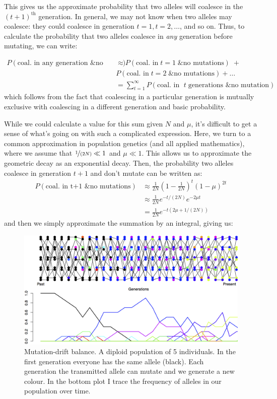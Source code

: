 This gives us the approximate probability that two alleles will coalesce in the
$(t+1)^\text{th}$ generation. In general, we may not know when two alleles may
coalesce: they could coalesce in generation $t=1, t=2, \ldots $, and so on.
Thus, to calculate the probability that two alleles coalesce in \emph{any}
generation before mutating, we can write:

\begin{align*}
  P(\textrm{coal. in any generation \& no mutations}) &\approx P(\textrm{coal. in} \; t=1 \; \textrm{\& no mutations}) \; + \\ 
&  P(\textrm{coal. in} \; t=2 \; \textrm{\& no mutations}) + \ldots \\
  &= \sum_{t=1}^\infty P(\textrm{coal. in } \; t \; \textrm{generations \& no mutation})
\end{align*}
%
which follows from the fact that coalescing in a particular generation is
mutually exclusive with coalescing in a different generation and basic probability.

While we could calculate a value for this sum given $N$ and $\mu$, it's
difficult to get a sense of what's going on with such a complicated expression.
Here, we turn to a common approximation in population genetics (and all applied
mathematics), where we assume that $\nicefrac{1}{(2N)} \ll 1$ and $\mu \ll 1$.
This allows us to approximate the geometric decay as an exponential decay.
Then, the probability two alleles coalesce in generation $t+1$ and don't mutate
can be written as:
%
\begin{align} P(\textrm{coal. in t+1 \& no mutations}) &\approx \frac{1}{2N}
\left(1- \frac{1}{2N} \right)^t \left(1-\mu \right)^{2t} \\ 
& \approx \frac{1}{2N} e^{-t/(2N)} e^{-2\mu t } \\
&=\frac{1}{2N} e^{-t(2\mu+1/(2N))} \end{align} 
%
and then we simply approximate the summation by an integral, giving us:
%
\begin{figure} \begin{center} \includegraphics[width= 0.8
\textwidth]{figures/Mut_drift_balance.png} \end{center} \caption{Mutation-drift
balance. A diploid population of 5 individuals. In the first generation
everyone has the same allele (black). Each generation the transmitted allele
can mutate and we generate a new colour. In the bottom plot I trace the
frequency of alleles in our population over time.} \label{fig:Mut_Sel_balance}
\end{figure} 

